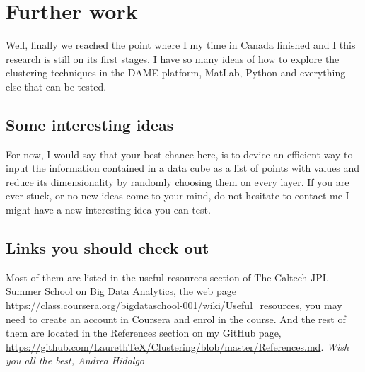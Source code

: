 \documentclass[11pt,fleqn]{book} %
\begin{document}
\section{Further work}
Well, finally we reached the point where I my time in Canada finished and I this research is still on its first stages. I have so many ideas of how to explore the clustering techniques in the DAME platform, MatLab, Python and everything else that can be tested. 

\subsection{Some interesting ideas}

For now, I would say that your best chance here, is to device an efficient way to input the information contained in a data cube as a list of points with values and reduce its dimensionality by randomly choosing them on every layer. If you are ever stuck, or no new ideas come to your mind, do not hesitate to contact me I might have a new interesting idea you can test.

\subsection{Links you should check out}
Most of them are listed in the useful resources section of The Caltech-JPL Summer School on Big Data Analytics, the web page \url{https://class.coursera.org/bigdataschool-001/wiki/Useful_resources}, you may need to create an account in Coursera and enrol in the course. And the rest of them are located in the References section on my GitHub page, \url{https://github.com/LaurethTeX/Clustering/blob/master/References.md}.
\vfill
\textit{Wish you all the best, Andrea Hidalgo}
\end{document}
